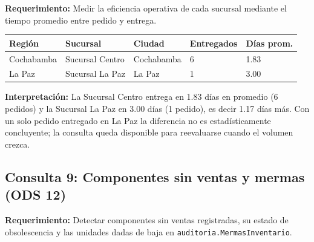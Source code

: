 \textbf{Requerimiento:} Medir la eficiencia operativa de cada sucursal mediante el tiempo promedio entre pedido y entrega.



\begin{center}
\label{tab:q8}
\begin{tablaAPA}
\begin{tabular}{L{2.6cm} L{3.6cm} L{2.4cm} R{2.4cm} R{2.0cm}}
\toprule
\textbf{Región} & \textbf{Sucursal} & \textbf{Ciudad} & \textbf{Entregados} & \textbf{Días prom.} \\
\midrule
Cochabamba & Sucursal Centro & Cochabamba & 6 & 1.83 \\
La Paz & Sucursal La Paz & La Paz & 1 & 3.00 \\
\bottomrule
\end{tabular}
\end{tablaAPA}
\end{center}

\textbf{Interpretación:} La Sucursal Centro entrega en 1.83 días en promedio (6 pedidos) y la Sucursal La Paz en 3.00 días (1 pedido), es decir 1.17 días más.
Con un solo pedido entregado en La Paz la diferencia no es estadísticamente concluyente; la consulta queda disponible para reevaluarse cuando el volumen crezca.

\subsection{Consulta 9: Componentes sin ventas y mermas (ODS 12)}

\textbf{Requerimiento:} Detectar componentes sin ventas registradas, su estado de obsolescencia y las unidades dadas de baja en \texttt{auditoria.MermasInventario}.



